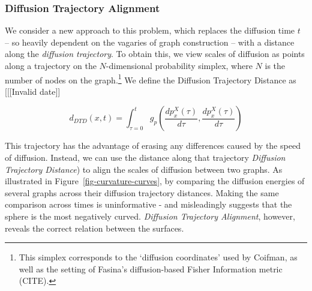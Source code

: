 \documentclass[
  letterpaper,
  DIV=11,
  numbers=noendperiod]{scrartcl}
\theoremstyle{plain}
\theoremstyle{definition}
\theoremstyle{plain}
\theoremstyle{plain}
\theoremstyle{definition}
\theoremstyle{remark}
\begin{document}
\subsubsection{Diffusion Trajectory
Alignment}\label{diffusion-trajectory-alignment}

We consider a new approach to this problem, which replaces the diffusion
time \(t\) -- so heavily dependent on the vagaries of graph construction
-- with a distance along the \emph{diffusion trajectory}. To obtain
this, we view scales of diffusion as points along a trajectory on the
\(N\)-dimensional probability simplex, where \(N\) is the number of
nodes on the graph.\footnote{This simplex corresponds to the `diffusion
  coordinates' used by Coifman, as well as the setting of Fasina's
  diffusion-based Fisher Information metric (CITE).} We define the
Diffusion Trajectory Distance as {[}{[}{[}Invalid date{]}{]}

\[
d_{DTD}(x, t)= \int_{\tau=0}^{t} g_p\left(\frac{d p_x^X(\tau)}{d \tau}, \frac{ d p_x^X(\tau) }{d \tau} \right)
\]

This trajectory has the advantage of erasing any differences caused by
the speed of diffusion. Instead, we can use the distance along that
trajectory \emph{Diffusion Trajectory Distance}) to align the scales of
diffusion between two graphs. As illustrated in
Figure~\ref{fig-curvature-curves}, by comparing the diffusion energies
of several graphs across their diffusion trajectory distances. Making
the same comparison across times is uninformative - and misleadingly
suggests that the sphere is the most negatively curved. \emph{Diffusion
Trajectory Alignment}, however, reveals the correct relation between the
surfaces.
\end{document}
